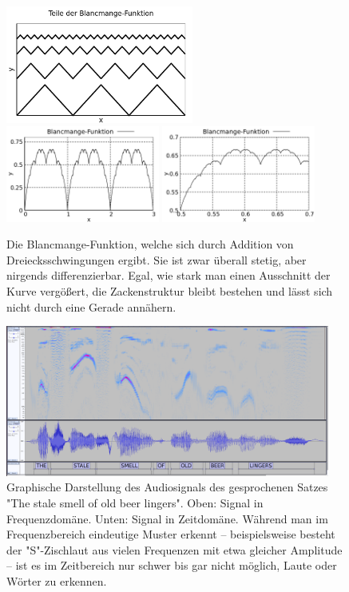 \begin{figure}[H]
    \centering
    \includegraphics[width=0.55\textwidth]{./gnuplot/blancmange-function-parts}
    \includegraphics[width=0.45\textwidth]{./gnuplot/blancmange-function-total}
    \includegraphics[width=0.45\textwidth]{./gnuplot/blancmange-function-zoomed}
    \caption[Konstruktion der Blancmange-Funktion]{Die Blancmange-Funktion, welche sich durch Addition von Dreiecksschwingungen ergibt. Sie ist zwar überall stetig, aber nirgends differenzierbar. Egal, wie stark man einen Ausschnitt der Kurve vergößert, die Zackenstruktur bleibt bestehen und lässt sich nicht durch eine Gerade annähern.}
    \label{fig:BlancmangeFunction}
\end{figure}

\begin{figure}[H]
    \centering
    \includegraphics[width=0.95\textwidth]{./img/speech-recognition}
    \caption[Frequenzspektrum eines Audiosignals]{Graphische Darstellung des Audiosignals des gesprochenen Satzes "The stale smell of old beer lingers". Oben: Signal in Frequenzdomäne. Unten: Signal in Zeitdomäne. Während man im Frequenzbereich eindeutige Muster erkennt -- beispielsweise besteht der "S"-Zischlaut aus vielen Frequenzen mit etwa gleicher Amplitude -- ist es im Zeitbereich nur schwer bis gar nicht möglich, Laute oder Wörter zu erkennen.}
    \label{fig:SpeechFreq}
\end{figure}

